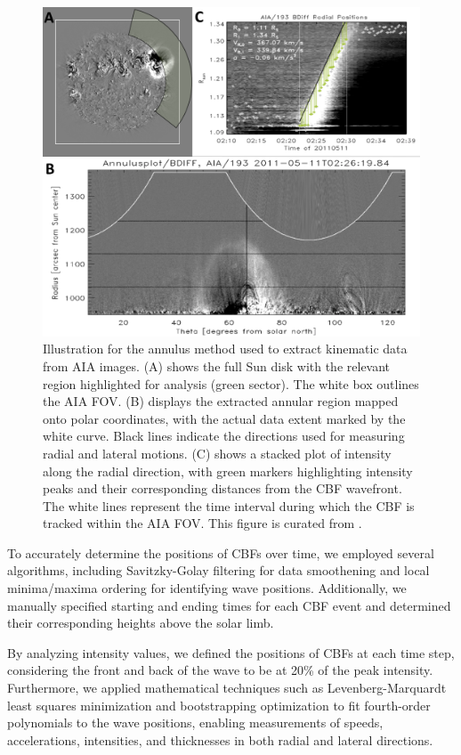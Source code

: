 \begin{figure}[!htp] %
	\centerline{\includegraphics[width=0.9\columnwidth]{chapter2/figs/fig_annplot.pdf}}
	\caption{Illustration for the annulus method used to extract kinematic data from AIA images. (A) shows the full Sun disk with the relevant region highlighted for analysis (green sector). The white box outlines the AIA FOV. (B) displays the extracted annular region mapped onto polar coordinates, with the actual data extent marked by the white curve. Black lines indicate the directions used for measuring radial and lateral motions. (C) shows a stacked plot of intensity along the radial direction, with green markers highlighting intensity peaks and their corresponding distances from the CBF wavefront. The white lines represent the time interval during which the CBF is tracked within the AIA FOV. This figure is curated from \citep{kozarev_2017}.}
	\label{fig_annplot}
\end{figure}

To accurately determine the positions of CBFs over time, we employed several algorithms, including Savitzky-Golay filtering \citep{savitzky_1964} for data smoothening and local minima/maxima ordering for identifying wave positions. Additionally, we manually specified starting and ending times for each CBF event and determined their corresponding heights above the solar limb.

By analyzing intensity values, we defined the positions of CBFs at each time step, considering the front and back of the wave to be at 20\% of the peak intensity. Furthermore, we applied mathematical techniques such as Levenberg-Marquardt least squares minimization \citep{markwardt_2009} and bootstrapping optimization \citep{efron_1979} to fit fourth-order polynomials to the wave positions, enabling measurements of speeds, accelerations, intensities, and thicknesses in both radial and lateral directions.


